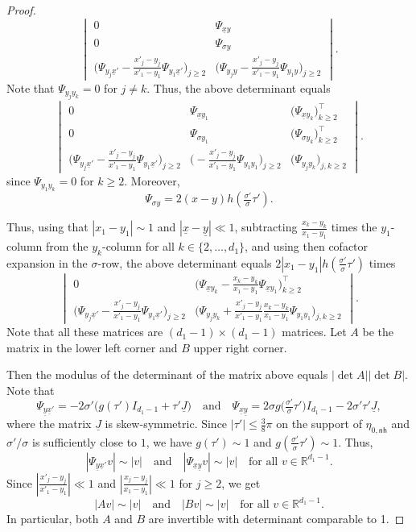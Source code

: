 \documentclass[leqno]{amsart}
\theoremstyle{definition}
\theoremstyle{remark}
\numberwithin{equation}{section}
\newcommand{\R}{\mathbb{R}}
\begin{document}
\begin{proof}
\[
\begin{vmatrix}
0 & \Psi_{\underline xy} \\
0 & \Psi_{\sigma y} \\
\big(\Psi_{y_j\underline x'} -\tfrac{x'_j-y_j}{x'_1-y_1}\Psi_{y_1\underline x'}\big)_{j\ge 2} & \big(\Psi_{y_j y} -\tfrac{x'_j-y_j}{x'_1-y_1}\Psi_{y_1 y}\big)_{j\ge 2}
\end{vmatrix}.
\]
Note that $\Psi_{y_j y_k} = 0$ for $j\neq k$. Thus, the above determinant equals
\[
\begin{vmatrix}
0 & \Psi_{\underline xy_1} & \big(\Psi_{\underline xy_k}\big)_{k\ge 2}^\intercal \\
0 & \Psi_{\sigma y_1}& \big(\Psi_{\sigma y_k}\big)_{k\ge 2}^\intercal \\
\big(\Psi_{y_j\underline x'} -\tfrac{x'_j-y_j}{x'_1-y_1}\Psi_{y_1\underline x'}\big)_{j\ge 2} & \big(-\tfrac{x'_j-y_j}{x'_1-y_1}\Psi_{y_1 y_1}\big)_{j\ge 2} & \big(\Psi_{y_j y_k}\big)_{j,k\ge 2} 
\end{vmatrix}.
\]
since $\Psi_{y_1 y_k}=0$ for $k\ge2.$
Moreover, 
\[
\Psi_{\sigma y} = 2 \left(x-y\right)h(\tfrac{\sigma'}{\sigma}\tau').
\]
 
Thus, using that $|x_1-y_1|\sim 1$ and $|\underline x-\underline y|\ll 1$, subtracting $\tfrac{x_k-y_k}{x_1-y_1}$ times the $y_1$-column from the $y_k$-column for all $k\in \{2,\dots,d_1\}$, and using then cofactor expansion in the $\sigma$-row, the above determinant equals $2 \left|x_1-y_1\right|h(\tfrac{\sigma'}{\sigma}\tau')$ times
 \[
\begin{vmatrix}
0 & \big(\Psi_{\underline x y_k} - \tfrac{x_k-y_k}{x_1-y_1} \Psi_{\underline xy_1}\big)_{k\ge 2}^\intercal \\
\big(\Psi_{y_j\underline x'} -\tfrac{x'_j-y_j}{x'_1-y_1}\Psi_{y_1\underline x'}\big)_{j\ge 2} & \big(\Psi_{y_j y_k} + \tfrac{x'_j-y_j}{x'_1-y_1}\tfrac{x_k-y_k}{x_1-y_1}\Psi_{y_1 y_1}\big)_{j,k\ge 2}
\end{vmatrix}.
\]
Note that all these matrices are $(d_1-1)\times (d_1-1)$ matrices. Let $A$ be the matrix in the lower left corner and $B$ upper right corner.

Then the modulus of the determinant of the matrix above equals $\left|\det A\right|\left|\det B\right|$. 
Note that
\[
\Psi_{\underline y \underline x'} = -2\sigma' \big(g(\tau')I_{d_1-1} + \tau'\underline{J}\big)
\quad\text{and}\quad
\Psi_{\underline x \underline y}
=2\sigma g\big(\tfrac{\sigma'}{\sigma}\tau'\big)I_{d_1-1}
-2\sigma'\tau'\underline{J},
\]
where the matrix $\underline{J}$ is skew-symmetric. Since $|\tau'|\le \frac 3 8 \pi$ on the support of $\eta_{0,\mathsf{nh}}$ and $\sigma'/\sigma$ is sufficiently close to $1$, we have $g(\tau')\sim 1$ and $g(\tfrac{\sigma'}{\sigma}\tau')\sim 1$. Thus,
\[
| \Psi_{\underline y \underline x'} v| \sim |v| \quad\text{and}\quad 
| \Psi_{\underline x \underline y} v| \sim |v| \quad\text{for all } v\in\R^{d_1-1}. 
\]
Since $|\frac{x'_j-y_j}{x'_1-y_1}|\ll 1$ and $|\frac{x_j-y_j}{x_1-y_1}|\ll1$ for $j\ge2$, we get
\[
|Av|\sim |v| \quad\text{and}\quad |Bv|\sim |v| \quad \text{for all } v\in\R^{d_1-1}. 
\]
In particular, both $A$ and $B$ are invertible with determinant comparable to 1.
\end{proof}
\end{document}
